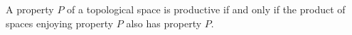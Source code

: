 A property $P$ of a topological space is productive if and only if the product of spaces enjoying property $P$ also has property $P$.
